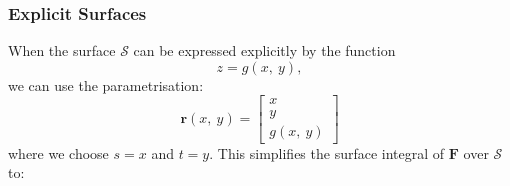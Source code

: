 \documentclass{article}
\begin{document}
\subsubsection{Explicit Surfaces}
When the surface \(\mathscr{S}\) can be expressed explicitly by the
function
\begin{equation*}
    z = g\left( x,\: y \right),
\end{equation*}
we can use the parametrisation:
\begin{equation*}
    \symbf{r}\left( x,\: y \right) =
    \begin{bmatrix}
        x \\
        y \\
        g\left( x,\: y \right)
    \end{bmatrix}
\end{equation*}
where we choose \(s = x\) and \(t = y\). This simplifies the surface
integral of \(\symbf{F}\) over \(\mathscr{S}\) to:
\end{document}
